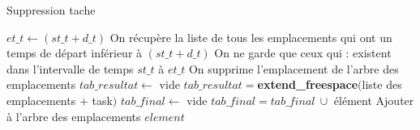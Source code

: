 \documentclass{report}
\begin{document}
\begin{algorithm}
\caption{Suppression tache}\label{Remove}
\begin{algorithmic}[1]
	\State $et\_t \gets (st\_t + d\_t)$
	\State
	\State On récupère la liste de tous les emplacements qui ont un temps de départ inférieur à $(st\_t + d\_t)$ 
	\State
	\State On ne garde que ceux qui :
		\State \hspace{\algorithmicindent} existent dans l'intervalle de temps $st\_t$ à $et\_t$
	\State
		\State On supprime l'emplacement de l'arbre des emplacements	
	\EndFor
	\State
	\State $tab\_resultat \gets$ vide
	\State
	\State $tab\_resultat =$\textbf{extend\_freespace}$($liste des emplacements + task$)$
	\State
	\State $tab\_final \gets $ vide
	\State
			\State $tab\_final = tab\_final\ \cup$ élément
		\EndIf
	\EndFor
	\State
		\State Ajouter à l'arbre des emplacements $element$
	\EndFor
	\State
\EndFunction
\end{algorithmic}
\end{algorithm}
\end{document}
